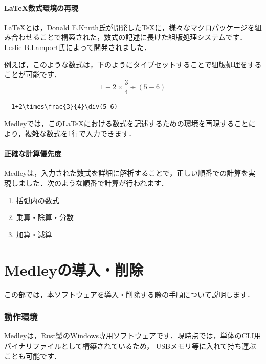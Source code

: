 \documentclass{ltjsarticle}
\begin{document}
    \subsection{\LaTeX{}数式環境の再現}
    \LaTeX{}とは，Donald E.Knuth氏が開発した\TeX{}に，様々なマクロパッケージを組み合わせることで構築された，数式の記述に長けた組版処理システムです．
    Leslie B.Lamport氏によって開発されました．\par
    例えば，このような数式は，下のようにタイプセットすることで組版処理をすることが可能です．
    \begin{equation*}
        1+2\times\frac{3}{4}\div(5-6)
    \end{equation*}
    \begin{lstlisting}
  1+2\times\frac{3}{4}\div(5-6)
    \end{lstlisting}\par
    Medleyでは，この\LaTeX{}における数式を記述するための環境を再現することにより，複雑な数式を1行で入力できます．

    \subsection{正確な計算優先度}
    Medleyは，入力された数式を詳細に解析することで，正しい順番での計算を実現しました．次のような順番で計算が行われます．
    \begin{enumerate}
        \item 括弧内の数式
        \item 乗算・除算・分数
        \item 加算・減算
    \end{enumerate}

    \newpage


    \part{Medleyの導入・削除}
    この部では，本ソフトウェアを導入・削除する際の手順について説明します．


    \section{動作環境}
    Medleyは，Rust製のWindows専用ソフトウェアです．現時点では，単体のCLI用バイナリファイルとして構築されているため，
    USBメモリ等に入れて持ち運ぶことも可能です．
\end{document}
